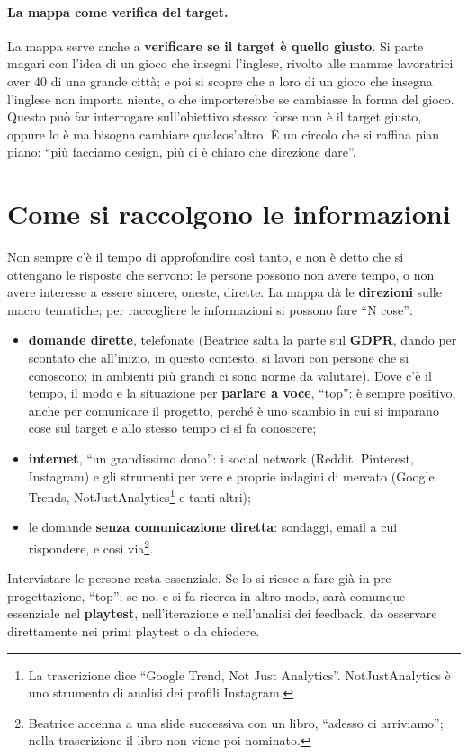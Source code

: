\paragraph{La mappa come verifica del target.} La mappa serve anche a
\textbf{verificare se il target è quello giusto}. Si parte magari con l'idea di un
gioco che insegni l'inglese, rivolto alle mamme lavoratrici over 40 di una grande
città; e poi si scopre che a loro di un gioco che insegna l'inglese non importa
niente, o che importerebbe se cambiasse la forma del gioco. Questo può far interrogare
sull'obiettivo stesso: forse non è il target giusto, oppure lo è ma bisogna cambiare
qualcos'altro. È un circolo che si raffina pian piano: ``più facciamo design, più ci è
chiaro che direzione dare''.

\section{Come si raccolgono le informazioni}
\label{a6:sec:raccolta}



Non sempre c'è il tempo di approfondire così tanto, e non è detto che si ottengano le
risposte che servono: le persone possono non avere tempo, o non avere interesse a
essere sincere, oneste, dirette. La mappa dà le \textbf{direzioni} sulle macro
tematiche; per raccogliere le informazioni si possono fare ``N cose'':
\begin{itemize}
  \item \textbf{domande dirette}, telefonate (Beatrice salta la parte sul
        \textbf{GDPR}, dando per scontato che all'inizio, in questo contesto, si
        lavori con persone che si conoscono; in ambienti più grandi ci sono norme da
        valutare). Dove c'è il tempo, il modo e la situazione per \textbf{parlare a
        voce}, ``top'': è sempre positivo, anche per comunicare il progetto, perché è
        uno scambio in cui si imparano cose sul target e allo stesso tempo ci si fa
        conoscere;
  \item \textbf{internet}, ``un grandissimo dono'': i social network (Reddit,
        Pinterest, Instagram) e gli strumenti per vere e proprie indagini di mercato
        (Google Trends, NotJustAnalytics\footnote{La trascrizione dice ``Google
        Trend, Not Just Analytics''. NotJustAnalytics è uno strumento di analisi dei
        profili Instagram.} e tanti altri);
  \item le domande \textbf{senza comunicazione diretta}: sondaggi, email a cui
        rispondere, e così via\footnote{Beatrice accenna a una slide successiva con un
        libro, ``adesso ci arriviamo''; nella trascrizione il libro non viene poi
        nominato.}.
\end{itemize}
Intervistare le persone resta essenziale. Se lo si riesce a fare già in
pre-progettazione, ``top''; se no, e si fa ricerca in altro modo, sarà comunque
essenziale nel \textbf{playtest}, nell'iterazione e nell'analisi dei feedback, da
osservare direttamente nei primi playtest o da chiedere.

